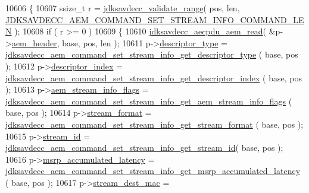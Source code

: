 \begin{DoxyCode}
10606 \{
10607     ssize\_t r = \hyperlink{group__util_ga9c02bdfe76c69163647c3196db7a73a1}{jdksavdecc\_validate\_range}( pos, len, 
      \hyperlink{group__command__set__stream__info_ga07fbd87fc77d6b4b2bd0b4e05900729d}{JDKSAVDECC\_AEM\_COMMAND\_SET\_STREAM\_INFO\_COMMAND\_LEN} );
10608     \textcolor{keywordflow}{if} ( r >= 0 )
10609     \{
10610         \hyperlink{group__aecpdu__aem_gae2421015dcdce745b4f03832e12b4fb6}{jdksavdecc\_aecpdu\_aem\_read}( &p->\hyperlink{structjdksavdecc__aem__command__set__stream__info_ae1e77ccb75ff5021ad923221eab38294}{aem\_header}, base, pos, len );
10611         p->\hyperlink{structjdksavdecc__aem__command__set__stream__info_ab7c32b6c7131c13d4ea3b7ee2f09b78d}{descriptor\_type} = 
      \hyperlink{group__command__set__stream__info_ga0675b0a4a3ef453042df7a44d593254d}{jdksavdecc\_aem\_command\_set\_stream\_info\_get\_descriptor\_type}
      ( base, pos );
10612         p->\hyperlink{structjdksavdecc__aem__command__set__stream__info_a042bbc76d835b82d27c1932431ee38d4}{descriptor\_index} = 
      \hyperlink{group__command__set__stream__info_ga3307e1b78512000da0fd21eb6908fb74}{jdksavdecc\_aem\_command\_set\_stream\_info\_get\_descriptor\_index}
      ( base, pos );
10613         p->\hyperlink{structjdksavdecc__aem__command__set__stream__info_a01e6193642f6392292ade676656c9118}{aem\_stream\_info\_flags} = 
      \hyperlink{group__command__set__stream__info_gaafad60a3f37453750953a51743793e8a}{jdksavdecc\_aem\_command\_set\_stream\_info\_get\_aem\_stream\_info\_flags}
      ( base, pos );
10614         p->\hyperlink{structjdksavdecc__aem__command__set__stream__info_a77359be54ea386b1da66597746709ed0}{stream\_format} = 
      \hyperlink{group__command__set__stream__info_ga63a8f056b16ac001813c2d5092735558}{jdksavdecc\_aem\_command\_set\_stream\_info\_get\_stream\_format}
      ( base, pos );
10615         p->\hyperlink{structjdksavdecc__aem__command__set__stream__info_af4c017686a11885d1d514c21bcde8160}{stream\_id} = 
      \hyperlink{group__command__set__stream__info_ga896defcaa5ee7d104a5951d0ea18a674}{jdksavdecc\_aem\_command\_set\_stream\_info\_get\_stream\_id}( 
      base, pos );
10616         p->\hyperlink{structjdksavdecc__aem__command__set__stream__info_a58ec17b43515ffd62f6380695f8f59b2}{msrp\_accumulated\_latency} = 
      \hyperlink{group__command__set__stream__info_gadfe59a7c594ac051228abcd9946153ce}{jdksavdecc\_aem\_command\_set\_stream\_info\_get\_msrp\_accumulated\_latency}
      ( base, pos );
10617         p->\hyperlink{structjdksavdecc__aem__command__set__stream__info_acb9f6beb748e2b0e9086f809a4b3143d}{stream\_dest\_mac} = 

\end{DoxyCode}
